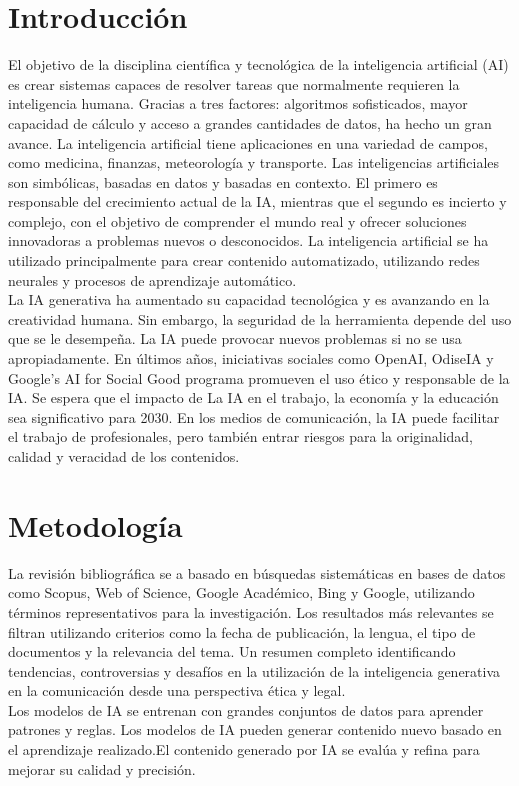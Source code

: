 \documentclass[12pt]{article}
\begin{document}
\section{Introducción}
El objetivo de la disciplina científica y tecnológica de la inteligencia artificial (AI) es crear sistemas capaces de resolver tareas que normalmente requieren la inteligencia humana. Gracias a tres factores: algoritmos sofisticados, mayor capacidad de cálculo y acceso a grandes cantidades de datos, ha hecho un gran avance. La inteligencia artificial tiene aplicaciones en una variedad de campos, como medicina, finanzas, meteorología y transporte. Las inteligencias artificiales son simbólicas, basadas en datos y basadas en contexto. El primero es responsable del crecimiento actual de la IA, mientras que el segundo es incierto y complejo, con el objetivo de comprender el mundo real y ofrecer soluciones innovadoras a problemas nuevos o desconocidos. La inteligencia artificial se ha utilizado principalmente para crear contenido automatizado, utilizando redes neurales y procesos de aprendizaje automático.\\
La IA generativa ha aumentado su capacidad tecnológica y es avanzando en la creatividad humana. Sin embargo, la seguridad de la herramienta depende del uso que se le desempeña. La IA puede provocar nuevos problemas si no se usa apropiadamente. En últimos años, iniciativas sociales como OpenAI, OdiseIA y Google's AI for Social Good programa promueven el uso ético y responsable de la IA. Se espera que el impacto de La IA en el trabajo, la economía y la educación sea significativo para 2030. En los medios de comunicación, la IA puede facilitar el trabajo de profesionales, pero también entrar riesgos para la originalidad, calidad y veracidad de los contenidos.

\section{ Metodología} \label{sec:firstpage}
La revisión bibliográfica se a basado en búsquedas sistemáticas en bases de datos como Scopus, Web of Science, Google Académico, Bing y Google, utilizando términos representativos para la investigación. Los resultados más relevantes se filtran utilizando criterios como la fecha de publicación, la lengua, el tipo de documentos y la relevancia del tema. Un resumen completo identificando tendencias, controversias y desafíos en la utilización de la inteligencia generativa en la comunicación desde una perspectiva ética y legal.
\\Los modelos de IA se entrenan con grandes conjuntos de datos para aprender patrones y reglas. Los modelos de IA pueden generar contenido nuevo basado en el aprendizaje realizado.El contenido generado por IA se evalúa y refina para mejorar su calidad y precisión.
\end{document}
